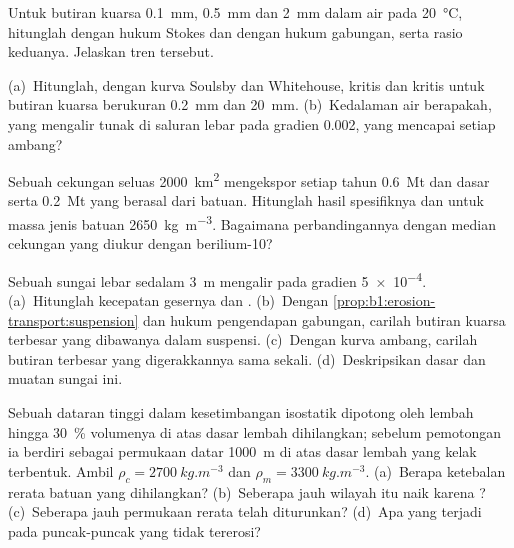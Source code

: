 \begin{exercise}[$\star\star$]\label{exo:b1:erosion-transport:7}
Untuk butiran kuarsa \qty{0.1}{mm}, \qty{0.5}{mm} dan \qty{2}{mm} dalam air pada
\qty{20}{\celsius}, hitunglah  dengan hukum Stokes dan dengan hukum gabungan, serta rasio keduanya. Jelaskan tren tersebut.
\end{exercise}

\begin{exercise}[$\star\star$]\label{exo:b1:erosion-transport:8}
(a)~Hitunglah, dengan kurva Soulsby dan Whitehouse,  kritis dan  kritis untuk butiran kuarsa berukuran \qty{0.2}{mm} dan
\qty{20}{mm}. (b)~Kedalaman air berapakah, yang mengalir tunak di saluran lebar pada gradien \num{0.002}, yang mencapai setiap ambang?
\end{exercise}

\begin{exercise}[$\star\star$]\label{exo:b1:erosion-transport:9}
Sebuah cekungan seluas \qty{2000}{km^2} mengekspor setiap tahun \qty{0.6}{Mt}  dan dasar serta \qty{0.2}{Mt}  yang berasal dari batuan. Hitunglah hasil spesifiknya dan  untuk massa jenis batuan
\qty{2650}{kg.m^{-3}}. Bagaimana perbandingannya dengan median cekungan yang diukur dengan berilium-10?
\end{exercise}

\begin{exercise}[$\star\star\star$]\label{exo:b1:erosion-transport:10}
Sebuah sungai lebar sedalam \qty{3}{m} mengalir pada gradien \num{5e-4}. (a)~Hitunglah kecepatan gesernya dan . (b)~Dengan
\cref{prop:b1:erosion-transport:suspension} dan hukum pengendapan gabungan, carilah butiran kuarsa terbesar yang dibawanya dalam suspensi. (c)~Dengan kurva ambang, carilah butiran terbesar yang digerakkannya sama sekali. (d)~Deskripsikan dasar dan muatan sungai ini.
\end{exercise}

\begin{exercise}[$\star\star\star$]\label{exo:b1:erosion-transport:11}
Sebuah dataran tinggi dalam kesetimbangan isostatik dipotong oleh lembah hingga \qty{30}{\percent} volumenya di atas dasar lembah dihilangkan; sebelum pemotongan ia berdiri sebagai permukaan datar \qty{1000}{m} di atas dasar lembah yang kelak terbentuk. Ambil
$\rho_c = \qty{2700}{kg.m^{-3}}$ dan $\rho_m = \qty{3300}{kg.m^{-3}}$.
(a)~Berapa ketebalan rerata batuan yang dihilangkan? (b)~Seberapa jauh wilayah itu naik karena ? (c)~Seberapa jauh permukaan rerata telah diturunkan? (d)~Apa yang terjadi pada puncak-puncak yang tidak tererosi?
\end{exercise}

